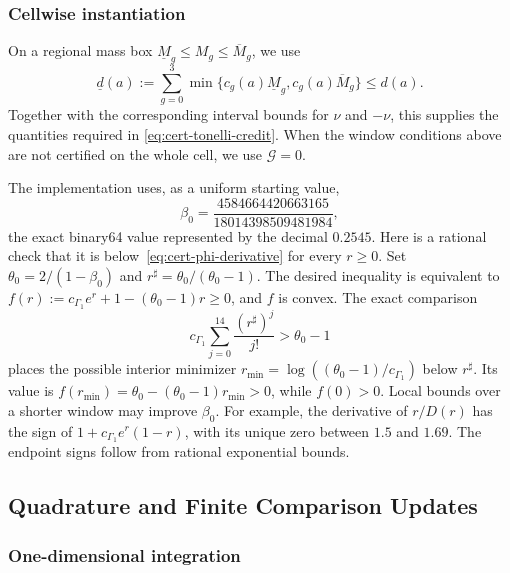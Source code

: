 \documentclass[11pt]{article}
\theoremstyle{definition}
\theoremstyle{remark}
\begin{document}
\subsubsection{Cellwise instantiation}
On a regional mass box
$\underline M_g\le M_g\le\overline M_g$, we use
\begin{equation}\label{eq:cert-credit-d-lower}
\underline d(a)
:=
\sum_{g=0}^3
\min\{c_g(a)\underline M_g,
c_g(a)\overline M_g\}
\le d(a).
\end{equation}
Together with the corresponding interval bounds for $\nu$ and $-\nu$,
this supplies the quantities required in
\eqref{eq:cert-tonelli-credit}. When the window conditions above are not certified on the whole cell,
we use $\mathcal G=0$.

The implementation uses, as a uniform starting value,
\[
 \beta_0=\frac{4584664420663165}{18014398509481984},
\]
the exact binary64 value represented by the decimal $0.2545$.
Here is a rational check that it is below~\eqref{eq:cert-phi-derivative} for every $r\ge0$.
Set $\theta_0=2/(1-\beta_0)$ and $r^\sharp=\theta_0/(\theta_0-1)$.
The desired inequality is equivalent to
$f(r):=c_{\Gamma_1} e^r+1-(\theta_0-1)r\ge0$, and $f$ is convex.
The exact comparison
\[
 c_{\Gamma_1}\sum_{j=0}^{14}\frac{(r^\sharp)^j}{j!}>\theta_0-1
\]
places the possible interior minimizer
$r_{\min}=\log((\theta_0-1)/c_{\Gamma_1})$ below $r^\sharp$.
Its value is $f(r_{\min})=\theta_0-(\theta_0-1)r_{\min}>0$, while $f(0)>0$.
Local bounds over a shorter window may improve $\beta_0$.
For example, the derivative of $r/D(r)$ has the sign of
$1+c_{\Gamma_1} e^r(1-r)$, with its unique zero between $1.5$ and $1.69$.
The endpoint signs follow from rational exponential bounds.

\subsection{Quadrature and Finite Comparison Updates}
\label{app:cert-direct-updates}

\subsubsection{One-dimensional integration}
\label{app:cert-quadrature}
\end{document}
